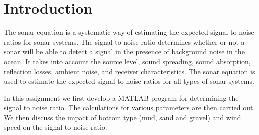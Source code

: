  \chapter*{Introduction}

\noindent The sonar equation is a systematic way of estimating the expected signal-to-noise ratios for sonar systems. The signal-to-noise ratio determines whether or not a sonar will be able to detect a signal in the presence of background noise in the ocean. It takes into account the source level, sound spreading, sound absorption, reflection losses, ambient noise, and receiver characteristics. The sonar equation is used to estimate the expected signal-to-noise ratios for all types of sonar systems.  

\noindent In this assignment we first develop a MATLAB program for determining the signal to noise ratio. The calculations for various parameters are then carried out. We then discuss the impact of bottom type (mud, sand and gravel) and wind speed on the signal to noise ratio.



